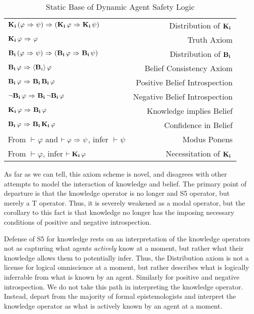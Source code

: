 \begin{table}[H]
	\begin{center}
		\begin{tabular}{| l r |}
			\hline
			$\mathbf{K}_{\mathbf{i}}\,(\varphi {\ \Rightarrow \ } \psi) {\ \Rightarrow \ } (\mathbf{K}_{\mathbf{i}}\,\varphi {\ \Rightarrow \ } \mathbf{K}_{\mathbf{i}}\,\psi)$ & Distribution of $\mathbf{K}_{\mathbf{i}}\,$ \\
			$\mathbf{K}_{\mathbf{i}}\,\varphi {\ \Rightarrow \ } \varphi$ & Truth Axiom \\
			$\mathbf{B}_{\mathbf{i}}\,(\varphi {\ \Rightarrow \ } \psi) {\ \Rightarrow \ } (\mathbf{B}_{\mathbf{i}}\,\varphi {\ \Rightarrow \ } \mathbf{B}_{\mathbf{i}}\,\psi)$ & Distribution of $\mathbf{B}_{\mathbf{i}}\,$\\
			$\mathbf{B}_{\mathbf{i}}\,\varphi {\ \Rightarrow \ } \langle \mathbf{B}_{i} \rangle\,\varphi$ & Belief Consistency Axiom\\
			$\mathbf{B}_{\mathbf{i}}\,\varphi {\ \Rightarrow \ } \mathbf{B}_{\mathbf{i}}\,\mathbf{B}_{\mathbf{i}}\,\varphi$ & Positive Belief Introspection \\
			${\neg}\mathbf{B}_{\mathbf{i}}\,\varphi {\ \Rightarrow \ } \mathbf{B}_{\mathbf{i}}\,{\neg}\mathbf{B}_{\mathbf{i}}\,\varphi$ & Negative Belief Introspection\\
			$\mathbf{K}_{\mathbf{i}}\,\varphi {\ \Rightarrow \ } \mathbf{B}_{\mathbf{i}}\,\varphi$ & Knowledge implies Belief \\
			$\mathbf{B}_{\mathbf{i}}\,\varphi {\ \Rightarrow \ } \mathbf{B}_{\mathbf{i}}\,\mathbf{K}_{\mathbf{i}}\,\varphi$ & Confidence in Belief\\
			From $\vdash \varphi$ and $\vdash \varphi {\ \Rightarrow \ } \psi$, infer $\vdash\psi$ & Modus Ponens\\
			From $\vdash \varphi$, infer $\vdash \mathbf{K}_{\mathbf{i}}\,\varphi$ & Necessitation of $\mathbf{K}_{\mathbf{i}}\,$\\
			\hline
		\end{tabular}
		\caption{Static Base of Dynamic Agent Safety Logic}
	\end{center}
\end{table}

As far as we can tell, this axiom scheme is novel, and disagrees with other attempts to model the interaction of knowledge and belief. The primary point of departure is that the knowledge operator is no longer and S5 operator, but merely a T operator. Thus, it is severely weakened as a modal operator, but the corollary to this fact is that knowledge no longer has the imposing necessary conditions of positive and negative introspection. 

Defense of S5 for knowledge rests on an interpretation of the knowledge operators not as capturing what agents \emph{actively} know at a moment, but rather what their knowledge allows them to potentially infer. Thus, the Distribution axiom is not a license for logical omniscience at a moment, but rather describes what is logically inferrable from what is known by an agent. Similarly for positive and negative introspection. We do not take this path in interpreting the knowledge operator. Instead, depart from the majority of formal epistemologists and interpret the knowledge operator as what is actively known by an agent at a moment.

